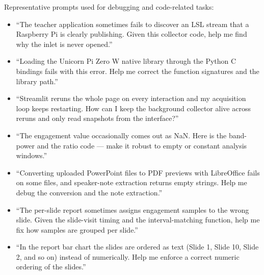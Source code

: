 \documentclass[12pt,a4paper,openany]{book}
\theoremstyle{definition}
\theoremstyle{remark}
\begin{document}
\noindent Representative prompts used for debugging and code-related tasks:
\begin{itemize}
    \item ``The teacher application sometimes fails to discover an LSL stream that a Raspberry Pi is clearly publishing. Given this collector code, help me find why the inlet is never opened.''
    \item ``Loading the Unicorn Pi Zero W native library through the Python C bindings fails with this error. Help me correct the function signatures and the library path.''
    \item ``Streamlit reruns the whole page on every interaction and my acquisition loop keeps restarting. How can I keep the background collector alive across reruns and only read snapshots from the interface?''
    \item ``The engagement value occasionally comes out as NaN. Here is the band-power and the ratio code --- make it robust to empty or constant analysis windows.''
    \item ``Converting uploaded PowerPoint files to PDF previews with LibreOffice fails on some files, and speaker-note extraction returns empty strings. Help me debug the conversion and the note extraction.''
    \item ``The per-slide report sometimes assigns engagement samples to the wrong slide. Given the slide-visit timing and the interval-matching function, help me fix how samples are grouped per slide.''
    \item ``In the report bar chart the slides are ordered as text (Slide 1, Slide 10, Slide 2, and so on) instead of numerically. Help me enforce a correct numeric ordering of the slides.''
\end{itemize}
\end{document}

